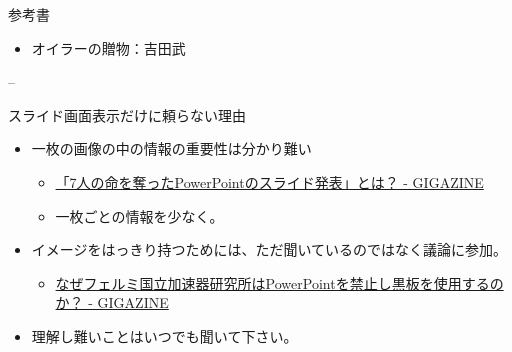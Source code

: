 \begin{frame}
\begin{block}{参考書}
\begin{itemize}
  \begin{itemize}
  \tightlist
  \item
    オイラーの贈物：吉田武
  \end{itemize}
\end{itemize}

--

\begin{block}{スライド画面表示だけに頼らない理由}

\begin{itemize}
\tightlist
\item
  一枚の画像の中の情報の重要性は分かり難い

  \begin{itemize}
  \tightlist
  \item
    \href{https://gigazine.net/news/20190506-powerpoint-slide-killed-seven-people/}{「7人の命を奪ったPowerPointのスライド発表」とは？
    - GIGAZINE}
  \item
    一枚ごとの情報を少なく。
  \end{itemize}
\item
  イメージをはっきり持つためには、ただ聞いているのではなく議論に参加。

  \begin{itemize}
  \tightlist
  \item
    \href{https://gigazine.net/news/20140413-switch-to-whiteboard/}{なぜフェルミ国立加速器研究所はPowerPointを禁止し黒板を使用するのか？
    - GIGAZINE}
  \end{itemize}
\item
  {理解し難いことはいつでも聞いて下さい。}
\end{itemize}

\end{block}

\end{block}

\end{frame}
